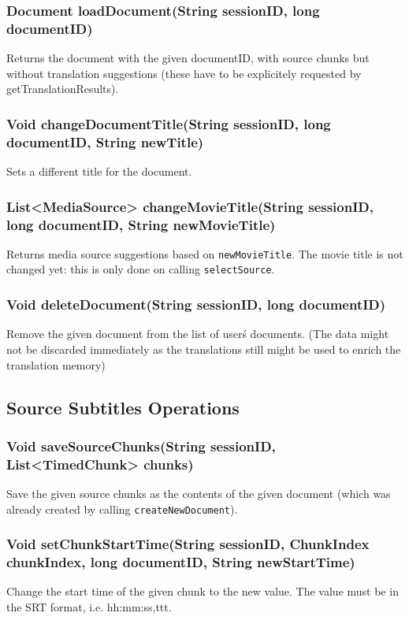 \subsubsection{Document loadDocument(String sessionID, long documentID)}
Returns the document with the given documentID, with source chunks but without translation suggestions (these have to be explicitely requested by getTranslationResults).

\subsubsection{Void changeDocumentTitle(String sessionID, long documentID, String newTitle)}
Sets a different title for the document.

\subsubsection{List<MediaSource> changeMovieTitle(String sessionID, long documentID, String newMovieTitle)}
Returns media source suggestions based on {\tt newMovieTitle}.
The movie title is not changed yet:
this is only done on calling {\tt selectSource}.
     	
\subsubsection{Void deleteDocument(String sessionID, long documentID)}
Remove the given document from the list of user\'s documents.
(The data might not be discarded immediately
as the translations still might be used to enrich the translation memory)	 

\subsection{Source Subtitles Operations}

\subsubsection{Void saveSourceChunks(String sessionID, List<TimedChunk> chunks)}
Save the given source chunks as the contents of the given document
(which was already created by calling {\tt createNewDocument}).

\subsubsection{Void setChunkStartTime(String sessionID, ChunkIndex chunkIndex, long documentID, String newStartTime)}
Change the start time of the given chunk to the new value. The value must be in the SRT format, i.e. hh:mm:ss,ttt.

